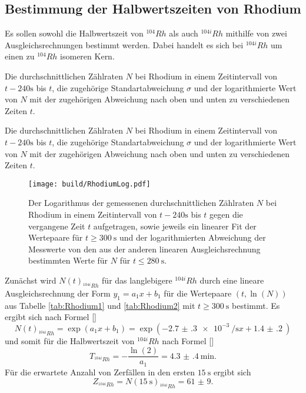 \subsection{Bestimmung der Halbwertszeiten von Rhodium}
Es sollen sowohl die Halbwertszeit von $^{104} Rh$ als auch $^{104i} Rh$ mithilfe von zwei Ausgleichsrechnungen bestimmt werden. Dabei handelt es sich bei $^{104i} Rh$ um einen zu $^{104} Rh$ isomeren Kern.
 \begin{table}
	\centering
	\caption{Die durchschnittlichen Zählraten $N$ bei Rhodium in einem Zeitintervall von $t-240\si{\second}$ bis $t$, die zugehörige Standartabweichung $\sigma$ und der logarithmierte Wert von $N$ mit der zugehörigen Abweichung nach oben und unten zu verschiedenen Zeiten $t$.}
	
\end{table}
\begin{table}
	\centering
	\caption{Die durchschnittlichen Zählraten $N$ bei Rhodium in einem Zeitintervall von $t-240\si{\second}$ bis $t$, die zugehörige Standartabweichung $\sigma$ und der logarithmierte Wert von $N$ mit der zugehörigen Abweichung nach oben und unten zu verschiedenen Zeiten $t$.}
	
\end{table}
\begin{figure}
	\centering
	\caption{Der Logarithmus der gemessenen durchschnittlichen Zählraten $N$ bei Rhodium in einem Zeitintervall von $t-240\si{\second}$ bis $t$ gegen die vergangene Zeit $t$ aufgetragen, sowie jeweils ein linearer Fit der Wertepaare für $t\ge \SI{300}{\second}$ und der logarithmierten Abweichung der Messwerte von den aus der anderen linearen Ausgleichsrechnung bestimmten Werte für $N$ für $t\le \SI{280}{\second}$.}
	\texttt{[image: build/RhodiumLog.pdf]}
	\label{fig:Rhodium}
\end{figure}
Zunächst wird $N(t)_{^{104i}Rh}$ für das langlebigere $^{104i} Rh$ durch eine lineare Ausgleichsrechnung der Form $y_1=a_1 x+b_1$ für die Wertepaare $(t,\ln(N))$ aus Tabelle \ref{tab:Rhodium1} und \ref{tab:Rhodium2} mit $t\ge \SI{300}{\second}$ bestimmt.
Es ergibt sich nach Formel \eqref{}
\begin{equation}
	N(t)_{^{104i}Rh} = \exp\left(a_1 x + b_1\right) = \exp\left(-\SI{2.7(3)e-3}{\per\second} x + \SI{1.4(2)}{}\right)
\end{equation}
und somit für die Halbwertszeit von $^{104i} Rh$ nach Formel \eqref{}
\begin{equation}
	T_{^{104i}Rh} = -\frac{\ln(2)}{a_1}=\SI{4.3(4)}{\minute}\text{.}
\end{equation}
Für die erwartete Anzahl von Zerfällen in den ersten $\SI{15}{\second}$ ergibt sich
\begin{equation}
	Z_{^{104i}Rh} = N(\SI{15}{\second})_{^{104i}Rh}=\num{61(9)}\text{.}
\end{equation}


